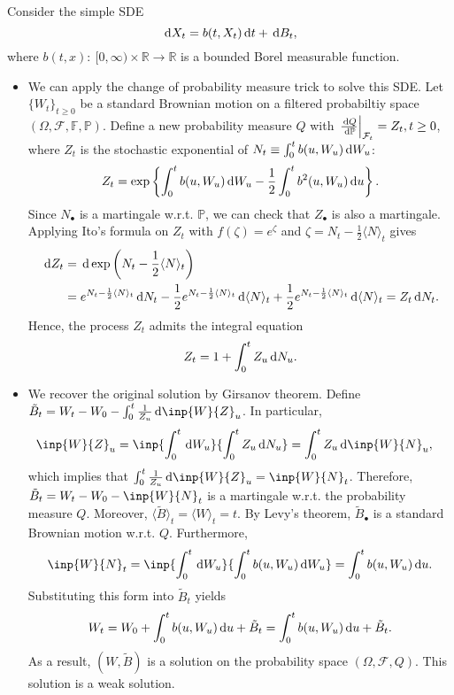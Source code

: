\begin{example}
Consider the simple SDE
\[
\,\mathrm{d} X_t = b(t,X_t)\,\mathrm{d} t + \,\mathrm{d} B_t,
\]
where $b(t,x):~[0,\infty)\times\mathbb{R}\to\mathbb{R}$ is a bounded Borel measurable function.
\begin{itemize}
\item
We can apply the change of probability measure trick to solve this SDE.
Let $\{W_t\}_{t\ge0}$ be a standard Brownian motion on a filtered probabiltiy space $(\Omega,\mathcal{F},\mathbb{F},\mathbb{P})$.
Define a new probability measure $Q$ with $\left.\frac{\,\mathrm{d} Q}{\,\mathrm{d}\mathbb{P}}\right|_{\mathcal{F}_t}=Z_t, t\ge0$, where $Z_t$ is the stochastic exponential of $N_t\equiv \int_0^tb(u,W_u)\,\mathrm{d} W_u$:
\[
Z_t = \exp\left\{
\int_0^tb(u,W_u)\,\mathrm{d} W_u - \frac{1}{2}\int_0^tb^2(u,W_u)\,\mathrm{d} u
\right\}.
\]
Since $N_{\bullet}$ is a martingale w.r.t. $\mathbb{P}$, we can check that $Z_{\bullet}$ is also a martingale.
Applying Ito's formula on $Z_t$ with $f(\zeta)=e^{\zeta}$ and $\zeta=N_t - \frac{1}{2}\langle N\rangle_t$ gives
\begin{align*}
\,\mathrm{d} Z_t&=\,\mathrm{d} \exp\left(
N_t - \frac{1}{2}\langle N\rangle_t
\right)\\
&=e^{
N_t - \frac{1}{2}\langle N\rangle_t
}\,\mathrm{d} N_t - \frac{1}{2}e^{
N_t - \frac{1}{2}\langle N\rangle_t
}\,\mathrm{d} \langle N\rangle_t + \frac{1}{2}e^{
N_t - \frac{1}{2}\langle N\rangle_t
}\,\mathrm{d} \langle N\rangle_t
=Z_t\,\mathrm{d} N_t.
\end{align*}
Hence, the process $Z_t$ admits the integral equation
\[
Z_t = 1 + \int_0^tZ_u\,\mathrm{d} N_u.
\]
\item
We recover the original solution by Girsanov theorem.
Define $\tilde{B}_t=W_t - W_0 - \int_0^t\frac{1}{Z_u}\diff\inp{W}{Z}_u$.
In particular,
\begin{align*}
\inp{W}{Z}_u&=\inp{\int_0^t\diff W_u}{\int_0^tZ_u\diff N_u}=\int_0^tZ_u\diff\inp{W}{N}_u,
\end{align*}
which implies that $\int_0^t\frac{1}{Z_u}\diff\inp{W}{Z}_u=\inp{W}{N}_t$.
Therefore, $\tilde{B}_t=W_t-W_0-\inp{W}{N}_t$ is a martingale w.r.t. the probability measure $Q$.
Moreover, $\langle \tilde{B}\rangle_t=\langle W\rangle_t=t$. By Levy's theorem, $\tilde{B}_{\bullet}$ is a standard Brownian motion w.r.t. $Q$.
Furthermore,
\[
\inp{W}{N}_t=\inp{\int_0^t\diff W_u}{\int_0^tb(u,W_u)\diff W_u}=\int_0^tb(u,W_u)\diff u.
\]
Substituting this form into $\tilde{B}_t$ yields
\[
W_t = W_0 + \int_0^tb(u,W_u)\,\mathrm{d} u + \tilde{B}_t = \int_0^tb(u,W_u)\,\mathrm{d} u + \tilde{B}_t.
\]
As a result, $(W,\tilde{B})$ is a solution on the probability space $(\Omega,\mathcal{F},Q)$.
This solution is a weak solution.
\end{itemize}

\end{example}


